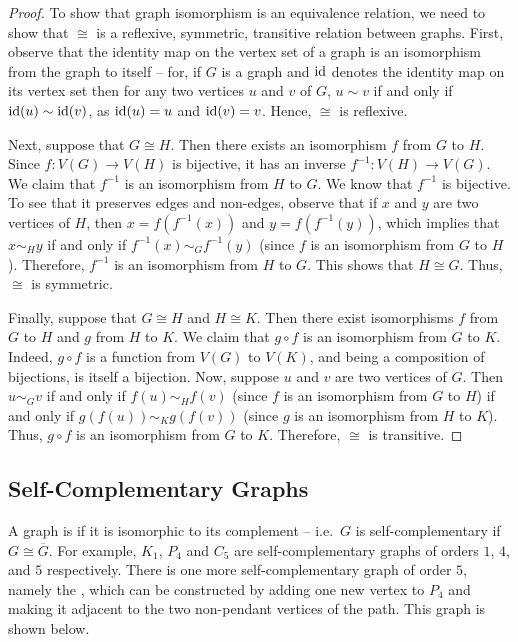 \begin{proof}
To show that graph isomorphism is an equivalence relation, we need to show that $\cong$ is a reflexive, symmetric, transitive relation between graphs. First, observe that the identity map on the vertex set of a graph is an isomorphism from the graph to itself -- for, if $G$ is a graph and $\mathrm{id}$ denotes the identity map on its vertex set then for any two vertices $u$ and $v$ of $G$, $u \sim v$ if and only if $\mathrm{id}(u) \sim \mathrm{id}(v)$, as $\mathrm{id}(u) = u$ and $\mathrm{id}(v) = v$. Hence, $\cong$ is reflexive.

Next, suppose that $G \cong H$. Then there exists an isomorphism $f$ from $G$ to $H$. Since $f \colon V(G) \to V(H)$ is bijective, it has an inverse $f^{-1} \colon V(H) \to V(G)$. We claim that $f^{-1}$ is an isomorphism from $H$ to $G$. We know that $f^{-1}$ is bijective. To see that it preserves edges and non-edges, observe that if $x$ and $y$ are two vertices of $H$, then $x = f(f^{-1}(x))$ and $y = f(f^{-1}(y))$, which implies that $x \sim_H y$ if and only if $f^{-1}(x) \sim_G f^{-1}(y)$ (since $f$ is an isomorphism from $G$ to $H$). Therefore, $f^{-1}$ is an isomorphism from $H$ to $G$. This shows that $H \cong G$. Thus, $\cong$ is symmetric.

Finally, suppose that $G \cong H$ and $H \cong K$. Then there exist isomorphisms $f$ from $G$ to $H$ and $g$ from $H$ to $K$. We claim that $g \circ f$ is an isomorphism from $G$ to $K$. Indeed, $g \circ f$ is a function from $V(G)$ to $V(K)$, and being a composition of bijections, is itself a bijection. Now, suppose $u$ and $v$ are two vertices of $G$. Then $u \sim_G v$ if and only if $f(u) \sim_H f(v)$ (since $f$ is an isomorphism from $G$ to $H$) if and only if $g(f(u)) \sim_K g(f(v))$ (since $g$ is an isomorphism from $H$ to $K$). Thus, $g \circ f$ is an isomorphism from $G$ to $K$. Therefore, $\cong$ is transitive.
\end{proof}

\subsection{Self-Complementary Graphs}\label{subsec:SC}

A graph is  if it is isomorphic to its complement -- i.e.\ $G$ is self-complementary if $G \cong \overline G$. For example, $K_1$, $P_4$ and $C_5$ are self-complementary graphs of orders $1$, $4$, and $5$ respectively. There is one more self-complementary graph of order $5$, namely the , which can be constructed by adding one new vertex to $P_4$ and making it adjacent to the two non-pendant vertices of the path. This graph is shown below.

